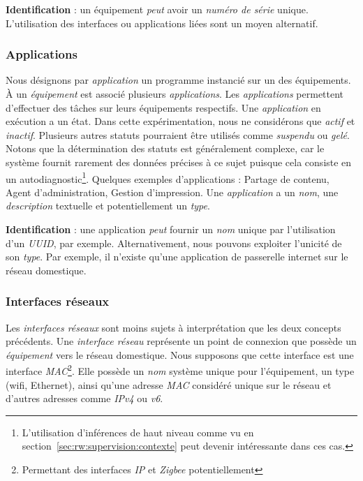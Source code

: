 \textbf{Identification} : un équipement \textit{peut} avoir un \textit{numéro de série} unique. L'utilisation des interfaces ou applications liées sont un moyen alternatif.

\subsubsection{Applications}
Nous désignons par \textit{application} un programme instancié sur un des équipements. À un \textit{équipement} est associé plusieurs \textit{applications}. Les \textit{applications} permettent d'effectuer des tâches sur leurs équipements respectifs. Une \textit{application} en exécution a un état. Dans cette expérimentation, nous ne considérons que \textit{actif} et \textit{inactif}. Plusieurs autres statuts pourraient être utilisés comme \textit{suspendu} ou \textit{gelé}. Notons que la détermination des statuts est généralement complexe, car le système fournit rarement des données précises à ce sujet puisque cela consiste en un autodiagnostic\footnote{L'utilisation d'inférences de haut niveau comme vu en section~\ref{sec:rw:supervision:contexte} peut devenir intéressante dans ces cas.}. Quelques exemples d'applications : Partage de contenu, Agent d'administration, Gestion d'impression. Une \textit{application} a un \textit{nom}, une \textit{description} textuelle et potentiellement un \textit{type}.

\textbf{Identification} : une application \textit{peut} fournir un \textit{nom} unique par l'utilisation d'un \textit{UUID}, par exemple. Alternativement, nous pouvons exploiter l'unicité de son \textit{type}. Par exemple, il n'existe qu'une application de passerelle internet sur le réseau domestique.

\subsubsection{Interfaces réseaux}
Les \textit{interfaces réseaux} sont moins sujets à interprétation que les deux concepts précédents. Une \textit{interface réseau} représente un point de connexion que possède un \textit{équipement} vers le réseau domestique. Nous supposons que cette interface est une interface \textit{MAC}\footnote{Permettant des interfaces \textit{IP} et \textit{Zigbee} potentiellement}. Elle possède un \textit{nom} système unique pour l'équipement, un type (wifi, Ethernet), ainsi qu'une adresse \textit{MAC} considéré unique sur le réseau et d'autres adresses comme \textit{IPv4} ou \textit{v6}.

